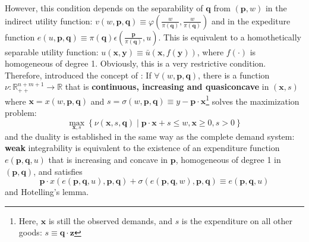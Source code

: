 However, this condition depends on the separability of $\mathbf{q}$ from $(\mathbf{p},w)$ in the indirect utility function: $v(w,\mathbf{p},\mathbf{q})\equiv \varphi\left(\frac{w}{\pi(\mathbf{q})},\frac{w}{\pi(\mathbf{q})}\right)$ and in the expediture function $e(u,\mathbf{p},\mathbf{q})\equiv \pi(\mathbf{q})\epsilon\left(\frac{\mathbf{p}}{\pi(\mathbf{q})},u\right)$. This is equivalent to a homothetically separable utility function: $u(\mathbf{x},\mathbf{y})\equiv \bar{u}\left(\mathbf{x},f(\mathbf{y})\right)$, where $f(\cdot)$ is homogeneous of degree 1. Obviously, this is a very restrictive condition. Therefore, \citeauthor*{lafrance1989dual} introduced the concept of : If $\forall (w,\mathbf{p},\mathbf{q})$, there is a function $\nu:\mathbb{R}^{n+m+1}_{++}\rightarrow \mathbb{R}$ that is \textbf{continuous, increasing and quasiconcave} in $(\mathbf{x},s)$ where $\mathbf{x} = x(w,\mathbf{p},\mathbf{q})$ and $s=\sigma(w,\mathbf{p},\mathbf{q})\equiv y-\mathbf{p}\cdot\mathbf{x}$\footnote{Here, $\mathbf{x}$ is still the observed demands, and $s$ is the expenditure on all other goods: $s\equiv \mathbf{q}\cdot \mathbf{z}$} solves the maximization problem:
$$
\max_{\mathbf{x},s}\left\{ \nu(\mathbf{x},s,\mathbf{q}) \mid \mathbf{p}\cdot\mathbf{x}+s\leq w, \mathbf{x}\geq 0,s>0 \right\}
$$
and the duality is established in the same way as the complete demand system: \textbf{weak} integrability is equivalent to the existence of an expenditure function $e(\mathbf{p},\mathbf{q},u)$ that is increasing and concave in $\mathbf{p}$, homogeneous of degree 1 in $(\mathbf{p},\mathbf{q})$, and satisfies 
$$
\mathbf{p}\cdot x(e(\mathbf{p},\mathbf{q},u),\mathbf{p},\mathbf{q}) + \sigma(e(\mathbf{p},\mathbf{q},w),\mathbf{p},\mathbf{q})\equiv e(\mathbf{p},\mathbf{q},u)
$$
and Hotelling's lemma. 

